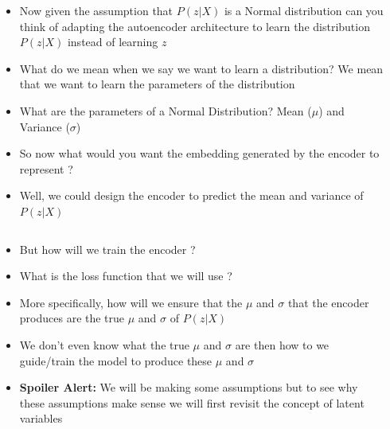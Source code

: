 \documentclass[serif,aspectratio=169,dvipsnames]{beamer}
\begin{document}
\begin{frame}
	\begin{columns}
		\begin{overlayarea}{\textwidth}{\textheight}
			\vspace{3pt}
			
		\end{overlayarea}
		\begin{overlayarea}{\textwidth}{\textheight}
			\begin{itemize}\justifying
				\item<1-> Now given the assumption that $P(z|X)$ is a Normal distribution can you think of adapting the autoencoder architecture to learn the distribution $P(z|X)$ instead of learning $z$
				\item<2-> What do we mean when we say we want to learn a distribution? We mean that we want to learn the parameters of the distribution
				\item<3-> What are the parameters of a Normal Distribution? Mean ($\mu$) and Variance ($\sigma$)
				\item<4-> So now what would you want the embedding generated by the encoder to represent ?
				\item<5-> Well, we could design the encoder to predict the mean and variance of $P(z|X)$
			\end{itemize}
		\end{overlayarea}
	\end{columns}
\end{frame}


\begin{frame}
	\begin{columns}
		\column{0.4\textwidth}
		\begin{overlayarea}{\textwidth}{\textheight}
			\vspace{3pt}
			
		\end{overlayarea}
		\column{0.6\textwidth}
		\begin{overlayarea}{\textwidth}{\textheight}
			\begin{itemize}\justifying
				\item<1-> But how will we train the encoder ?
				\item<2-> What is the loss function that we will use ?
				\item<3-> More specifically, how will we ensure that the $\mu$ and $\sigma$ that the encoder produces are the true $\mu$ and $\sigma$ of $P(z|X)$
				\item<4-> We don't even know what the true $\mu$ and $\sigma$ are then how to we guide/train the model to produce these $\mu$ and $\sigma$
				\item<5-> \textbf{Spoiler Alert:} We will be making some assumptions but to see why these assumptions make sense we will first revisit the concept of latent variables
			\end{itemize}
		\end{overlayarea}
	\end{columns}
\end{frame}
\end{document}
